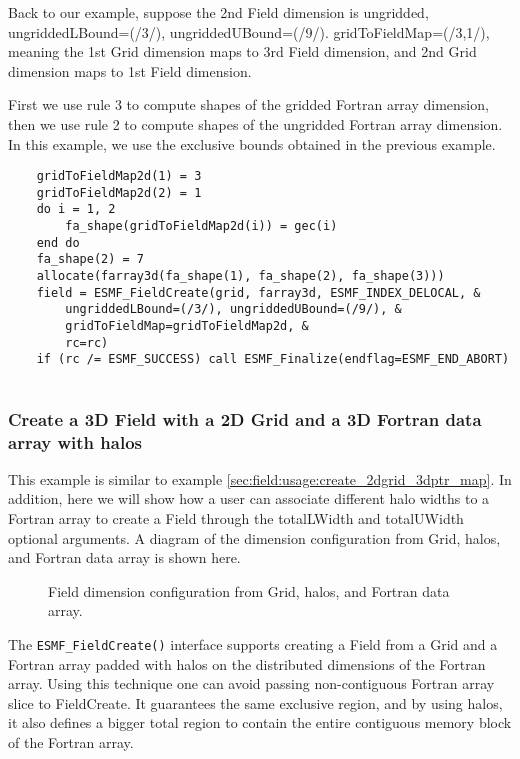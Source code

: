     Back to our example, suppose the 2nd
    Field dimension is ungridded, ungriddedLBound=(/3/), ungriddedUBound=(/9/).
    gridToFieldMap=(/3,1/), meaning the 1st Grid dimension maps to 3rd Field dimension,
    and 2nd Grid dimension maps to 1st Field dimension.
  
    First we use rule 3 to compute shapes of the gridded Fortran array dimension,
    then we use rule 2 to compute shapes of the ungridded Fortran array dimension.
    In this example, we use the exclusive bounds obtained in the previous
    example. 

 \begin{verbatim}
    gridToFieldMap2d(1) = 3
    gridToFieldMap2d(2) = 1
    do i = 1, 2
        fa_shape(gridToFieldMap2d(i)) = gec(i)
    end do
    fa_shape(2) = 7
    allocate(farray3d(fa_shape(1), fa_shape(2), fa_shape(3)))
    field = ESMF_FieldCreate(grid, farray3d, ESMF_INDEX_DELOCAL, &
        ungriddedLBound=(/3/), ungriddedUBound=(/9/), &
        gridToFieldMap=gridToFieldMap2d, &
        rc=rc)
    if (rc /= ESMF_SUCCESS) call ESMF_Finalize(endflag=ESMF_END_ABORT)
 
\end{verbatim}
 

  \subsubsection{Create a 3D Field with a 2D Grid and a 3D Fortran data array with halos}
  \label{sec:field:usage:create_2dgrid_3dptr_map_halo}
  
    This example is similar to example \ref{sec:field:usage:create_2dgrid_3dptr_map}.
    In addition, here we will show how
    a user can associate different halo widths to a Fortran array to create
    a Field through the totalLWidth and totalUWidth optional arguments.
    A diagram of the dimension configuration from Grid, halos, and Fortran data array
    is shown here.
  \begin{center}
  \begin{figure}
  \caption{Field dimension configuration from Grid, halos, and Fortran data array.}
  \label{fig:fieldparameter}
  \end{figure}
  \end{center}
    
    The {\tt ESMF\_FieldCreate()} interface supports creating a Field from a Grid and a
    Fortran array padded with halos on the distributed dimensions of the Fortran
    array. Using this technique one can avoid passing non-contiguous Fortran array
    slice to FieldCreate. It guarantees the same exclusive region,
    and by using halos, it also defines a bigger total region to contain 
    the entire contiguous memory block of the Fortran array.
  
